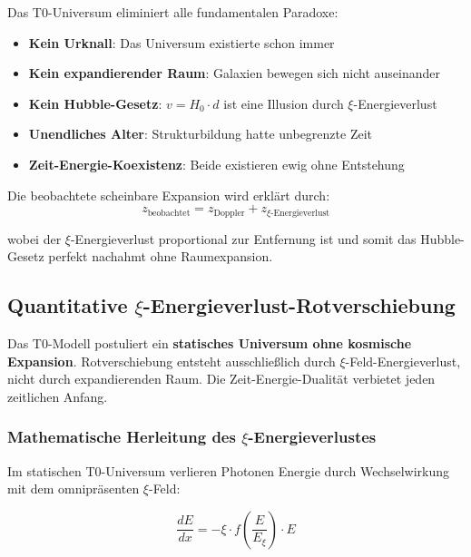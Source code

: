 \documentclass[12pt,a4paper]{article}
\theoremstyle{definition}
\begin{document}
	Das T0-Universum eliminiert alle fundamentalen Paradoxe:
	\begin{itemize}
		\item \textbf{Kein Urknall}: Das Universum existierte schon immer
		\item \textbf{Kein expandierender Raum}: Galaxien bewegen sich nicht auseinander
		\item \textbf{Kein Hubble-Gesetz}: $v = H_0 \cdot d$ ist eine Illusion durch $\xi$-Energieverlust
		\item \textbf{Unendliches Alter}: Strukturbildung hatte unbegrenzte Zeit
		\item \textbf{Zeit-Energie-Koexistenz}: Beide existieren ewig ohne Entstehung
	\end{itemize}
	
	Die beobachtete scheinbare Expansion wird erklärt durch:
	\begin{equation}
		z_{\text{beobachtet}} = z_{\text{Doppler}} + z_{\xi\text{-Energieverlust}}
	\end{equation}
	
	wobei der $\xi$-Energieverlust proportional zur Entfernung ist und somit das Hubble-Gesetz perfekt nachahmt ohne Raumexpansion.
	
	\subsection{Quantitative $\xi$-Energieverlust-Rotverschiebung}
	
	\begin{important}
		Das T0-Modell postuliert ein \textbf{statisches Universum ohne kosmische Expansion}. Rotverschiebung entsteht ausschließlich durch $\xi$-Feld-Energieverlust, nicht durch expandierenden Raum. Die Zeit-Energie-Dualität verbietet jeden zeitlichen Anfang.
	\end{important}
	
	\subsubsection{Mathematische Herleitung des $\xi$-Energieverlustes}
	
	Im statischen T0-Universum verlieren Photonen Energie durch Wechselwirkung mit dem omnipräsenten $\xi$-Feld:
	
	\begin{equation}
		\frac{dE}{dx} = -\xi \cdot f\left(\frac{E}{E_\xi}\right) \cdot E
	\end{equation}
	
\end{document}
